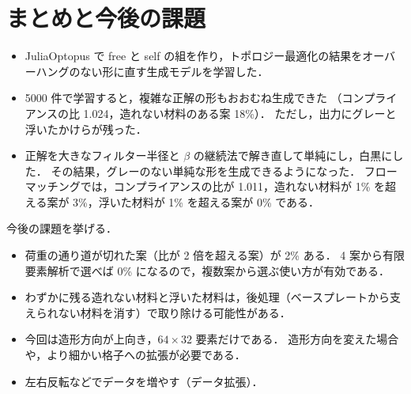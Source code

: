 \documentclass[a4paper,11pt]{ltjsarticle}
\begin{document}
\clearpage
\section{まとめと今後の課題}

\begin{itemize}
  \item JuliaOptopus で free と self の組を作り，トポロジー最適化の結果をオーバーハングのない形に直す生成モデルを学習した．
  \item 5000 件で学習すると，複雑な正解の形もおおむね生成できた
        （コンプライアンスの比 1.024，造れない材料のある案 18\%）．
        ただし，出力にグレーと浮いたかけらが残った．
  \item 正解を大きなフィルター半径と $\beta$ の継続法で解き直して単純にし，白黒にした．
        その結果，グレーのない単純な形を生成できるようになった．
        フローマッチングでは，コンプライアンスの比が 1.011，造れない材料が 1\% を超える案が 3\%，浮いた材料が 1\% を超える案が 0\% である．
\end{itemize}

今後の課題を挙げる．
\begin{itemize}
  \item 荷重の通り道が切れた案（比が 2 倍を超える案）が 2\% ある．
        4 案から有限要素解析で選べば 0\% になるので，複数案から選ぶ使い方が有効である．
  \item わずかに残る造れない材料と浮いた材料は，後処理（ベースプレートから支えられない材料を消す）で取り除ける可能性がある．
  \item 今回は造形方向が上向き，$64 \times 32$ 要素だけである．
        造形方向を変えた場合や，より細かい格子への拡張が必要である．
  \item 左右反転などでデータを増やす（データ拡張）．
\end{itemize}
\end{document}
